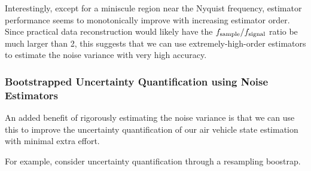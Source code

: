 \documentclass[11pt]{article}
\begin{document}
Interestingly, except for a miniscule region near the Nyquist frequency,
estimator performance seems to monotonically improve with increasing
estimator order. Since practical data reconstruction would likely have
the \(f_{\rm sample} / f_{\rm signal}\) ratio be much larger than 2,
this suggests that we can use extremely-high-order estimators to
estimate the noise variance with very high accuracy.

    \hypertarget{bootstrapped-uncertainty-quantification-using-noise-estimators}{%
\subsubsection{Bootstrapped Uncertainty Quantification using Noise
Estimators}\label{bootstrapped-uncertainty-quantification-using-noise-estimators}}

    An added benefit of rigorously estimating the noise variance is that we
can use this to improve the uncertainty quantification of our air
vehicle state estimation with minimal extra effort.

For example, consider uncertainty quantification through a resampling
boostrap.
\end{document}
